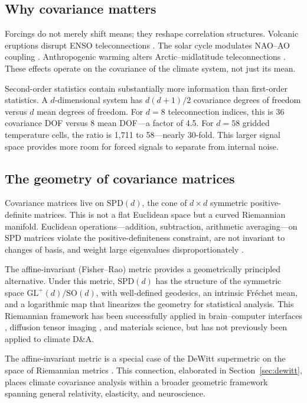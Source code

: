 \documentclass[preprint,12pt]{elsarticle}
\newcommand{\SPD}{\mathrm{SPD}}
\newcommand{\GL}{\mathrm{GL}}
\newcommand{\SO}{\mathrm{SO}}
\begin{document}
\subsection{Why covariance matters}

Forcings do not merely shift means; they reshape correlation structures.
Volcanic eruptions disrupt ENSO teleconnections \citep{Adams2003,Predybaylo2017}.
The solar cycle modulates NAO--AO coupling \citep{Gray2010,Scaife2013}.
Anthropogenic warming alters Arctic--midlatitude teleconnections \citep{FrancisVavrus2012,Cohen2014}.
These effects operate on the covariance of the climate system, not just its mean.

Second-order statistics contain substantially more information than first-order statistics.
A $d$-dimensional system has $d(d+1)/2$ covariance degrees of freedom versus $d$ mean degrees of freedom.
For $d=8$ teleconnection indices, this is 36 covariance DOF versus 8 mean DOF---a factor of 4.5.
For $d=58$ gridded temperature cells, the ratio is 1,711 to 58---nearly 30-fold.
This larger signal space provides more room for forced signals to separate from internal noise.

\subsection{The geometry of covariance matrices}

Covariance matrices live on $\SPD(d)$, the cone of $d \times d$ symmetric positive-definite matrices.
This is not a flat Euclidean space but a curved Riemannian manifold.
Euclidean operations---addition, subtraction, arithmetic averaging---on SPD matrices violate the positive-definiteness constraint, are not invariant to changes of basis, and weight large eigenvalues disproportionately \citep{Pennec2006,Moakher2005}.

The affine-invariant (Fisher--Rao) metric provides a geometrically principled alternative.
Under this metric, $\SPD(d)$ has the structure of the symmetric space $\GL^+(d)/\SO(d)$, with well-defined geodesics, an intrinsic Fr\'{e}chet mean, and a logarithmic map that linearizes the geometry for statistical analysis.
This Riemannian framework has been successfully applied in brain--computer interfaces \citep{Barachant2013}, diffusion tensor imaging \citep{Pennec2006,Guillot2015}, and materials science, but has not previously been applied to climate D\&A.

The affine-invariant metric is a special case of the DeWitt supermetric on the space of Riemannian metrics \citep{DeWitt1967}.
This connection, elaborated in Section~\ref{sec:dewitt}, places climate covariance analysis within a broader geometric framework spanning general relativity, elasticity, and neuroscience.
\end{document}
